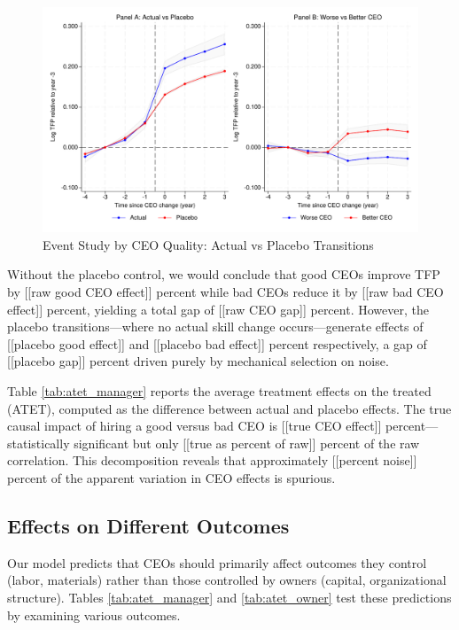 \documentclass[11pt,a4paper]{article}
\begin{document}
\begin{figure}[htbp]
\centering
\includegraphics[width=\textwidth]{figure/event_study.pdf}
\caption{Event Study by CEO Quality: Actual vs Placebo Transitions}
\label{fig:event_study_split}
\end{figure}

Without the placebo control, we would conclude that good CEOs improve TFP by [[raw good CEO effect]] percent while bad CEOs reduce it by [[raw bad CEO effect]] percent, yielding a total gap of [[raw CEO gap]] percent. However, the placebo transitions—where no actual skill change occurs—generate effects of [[placebo good effect]] and [[placebo bad effect]] percent respectively, a gap of [[placebo gap]] percent driven purely by mechanical selection on noise.

Table \ref{tab:atet_manager} reports the average treatment effects on the treated (ATET), computed as the difference between actual and placebo effects. The true causal impact of hiring a good versus bad CEO is [[true CEO effect]] percent—statistically significant but only [[true as percent of raw]] percent of the raw correlation. This decomposition reveals that approximately [[percent noise]] percent of the apparent variation in CEO effects is spurious.



\subsection{Effects on Different Outcomes}

Our model predicts that CEOs should primarily affect outcomes they control (labor, materials) rather than those controlled by owners (capital, organizational structure). Tables \ref{tab:atet_manager} and \ref{tab:atet_owner} test these predictions by examining various outcomes.
\end{document}
